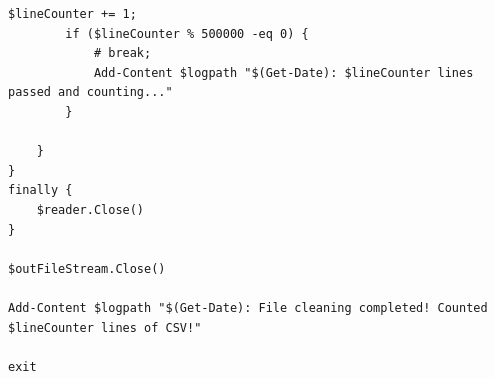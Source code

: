 \begin{Verbatim}[fontsize=\tiny]
        $lineCounter += 1;
        if ($lineCounter % 500000 -eq 0) {
            # break;
            Add-Content $logpath "$(Get-Date): $lineCounter lines passed and counting..."
        }

    }
}
finally {
    $reader.Close()
}

$outFileStream.Close()

Add-Content $logpath "$(Get-Date): File cleaning completed! Counted $lineCounter lines of CSV!"

exit

\end{Verbatim}

\clearpage

